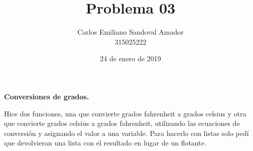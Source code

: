 \documentclass[letterpaper, 12pt, oneside]{article}%
\title{Problema 03}
\author{Carlos Emiliano Sandoval Amador \\ 315025222}
\date{24 de enero de 2019}
\begin{document}
	\maketitle
	\begin{center}
		\textbf{\large Conversiones de grados.}
	\end{center}
	Hice dos funciones, una que convierte grados fahrenheit a grados celsius y otra que convierte grados celsius a grados fahrenheit, utilizando las ecuaciones de conversión y asignando el valor a una variable. Para hacerlo con listas solo pedí que devolvieran una lista con el resultado en lugar de un flotante.
	
\end{document}
